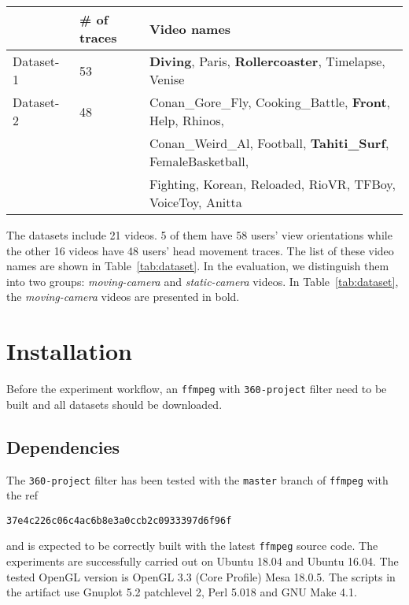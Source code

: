\begin{table*}\centering
{}
\caption{Dataset description}
\label{tab:dataset}
\begin{tabular}{@{}lll@{}} \toprule

   &  \# of traces & Video names \\
\midrule
    Dataset-1~\cite{Corbillon:2017:VHM:3083187.3083215} & 53 & {\bf Diving}, Paris, {\bf Rollercoaster}, Timelapse, Venise \\
    Dataset-2~\cite{Wu:2017:DEU:3083187.3083210}        & 48 & Conan\_Gore\_Fly, Cooking\_Battle, {\bf Front}, Help, Rhinos, \\
                                                        &    & Conan\_Weird\_Al, Football, {\bf Tahiti\_Surf}, FemaleBasketball, \\
                                                        &    & Fighting, Korean, Reloaded, RioVR, TFBoy, VoiceToy,  Anitta  \\
\bottomrule
\end{tabular}
\end{table*}

The datasets include 21 videos. 5 of them have 58 users' view orientations while the other 16 videos have 48 users'
head movement traces. The list of these video names are shown in Table~\ref{tab:dataset}. In the evaluation, we
distinguish them into two groups: {\it moving-camera} and {\it static-camera} videos. In Table~\ref{tab:dataset}, the
{\it moving-camera} videos are presented in bold.


\section{Installation}
\label{sec:installation}
Before the experiment workflow, an {\tt ffmpeg} with {\tt 360-project} filter need to be built and all datasets should
be downloaded.

\subsection{Dependencies}
The {\tt 360-project} filter has been tested with the {\tt master} branch of {\tt ffmpeg} with the ref

{\tt 37e4c226c06c4ac6b8e3a0ccb2c0933397d6f96f}

\noindent and is expected to be correctly built with the latest {\tt ffmpeg} source code. The experiments are
successfully carried out on Ubuntu 18.04 and Ubuntu 16.04. The tested OpenGL version is OpenGL 3.3 (Core Profile) Mesa
18.0.5. The scripts in the artifact use Gnuplot 5.2 patchlevel 2, Perl 5.018 and GNU Make 4.1.

